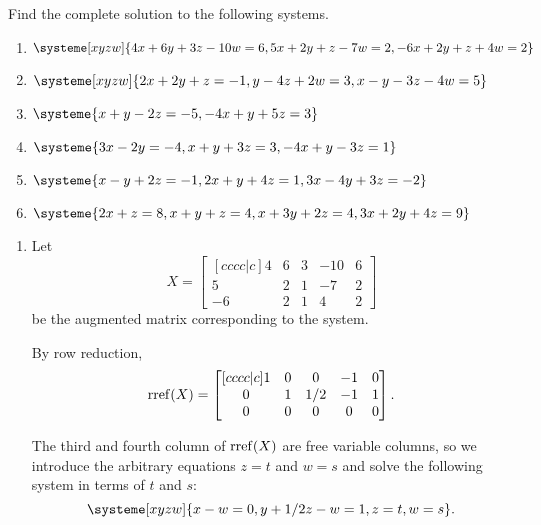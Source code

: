 \begin{exercises}
	\begin{problist}
		\prob Find the complete solution to the following systems.
		\begin{enumerate}
			\item $\systeme[xyzw]{4x+6y+3z-10w=6,5x+2y+z-7w=2,-6x+2y+z+4w=2}$
			\item $\systeme[xyzw]{2x+2y+z=-1,y-4z+2w=3,x-y-3z-4w=5}$
			\item $\systeme{x+y-2z=-5,-4x+y+5z=3}$
			\item $\systeme{3x-2y=-4,x+y+3z=3,-4x+y-3z=1}$
			\item $\systeme{x-y+2z=-1,2x+y+4z=1,3x-4y+3z=-2}$
			\item $\systeme{2x+z=8,x+y+z=4,x+3y+2z=4,3x+2y+4z=9}$
		\end{enumerate}
		\begin{solution}
			\begin{enumerate}
				\item 
				Let
				\[
					X=
					\begin{bmatrix}[cccc|c]
						4 & 6 & 3 & -10 & 6\\
						5 & 2 & 1 & -7 & 2\\
						-6 & 2 & 1 & 4 & 2
					\end{bmatrix}
				\]
				be the augmented matrix corresponding to the system.
				
				By row reduction,
				\[
					\operatorname{rref}(X)=
					\begin{bmatrix}[cccc|c]
						1 & 0 & 0 & -1 & 0\\
						0 & 1 & 1/2 & -1 & 1\\
						0 & 0 & 0 & 0 & 0
					\end{bmatrix}.
				\]
				
				The third and fourth column of $\operatorname{rref}(X)$ are free variable columns,
				so we introduce the arbitrary equations $z=t$ and $w=s$ and
				solve the following system in terms of $t$ and $s$:
				\[
					\systeme[xyzw]{x-w=0,y+1/2z-w=1,z=t,w=s}.
				\]
				

\end{enumerate}
\end{solution}
\end{problist}
\end{exercises}
